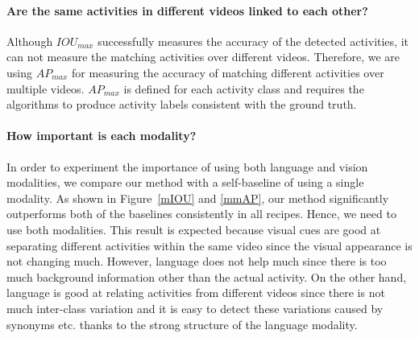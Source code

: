 \paragraph{Are the same activities in different videos linked to each other?}
Although $IOU_{max}$ successfully measures the accuracy of the detected activities, it can not measure the matching activities over different videos. Therefore, we are using $AP_{max}$ for measuring the accuracy of matching different activities over multiple videos. $AP_{max}$ is defined for each activity class and requires the algorithms to produce activity labels consistent with the ground truth. 
\paragraph{How important is each modality?}
In order to experiment the importance of using both language and vision modalities, we compare our method with a self-baseline of using a single modality. As shown in Figure~\ref{mIOU} and \ref{mmAP}, our method significantly outperforms both of the baselines consistently in all recipes. Hence, we need to use both modalities. This result is expected because visual cues are good at separating different activities within the same video since the visual appearance is not changing much. However, language does not help much since there is too much background information other than the actual activity. On the other hand, language is good at relating activities from different videos since there is not much inter-class variation and it is easy to detect these variations caused by synonyms etc. thanks to the strong structure of the language modality.
